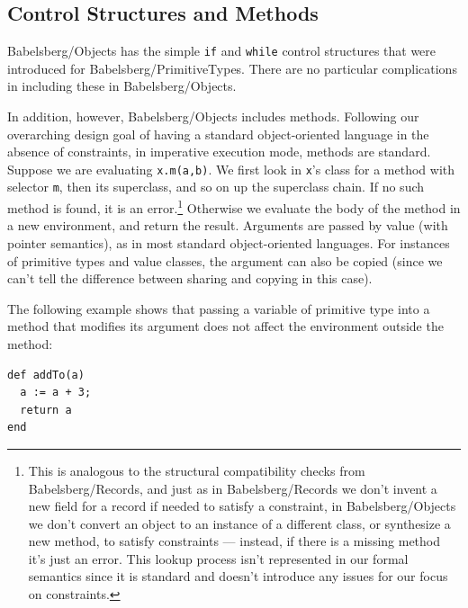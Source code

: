 \documentclass{article}
\def\ab#1{\textcolor{red}{\textsf{AB: #1}}}
\begin{document}

\subsection{Control Structures and Methods}

Babelsberg/Objects has the simple \verb|if| and \verb|while| control
structures that were introduced for Babelsberg/PrimitiveTypes.  There
are no particular complications in including these in
Babelsberg/Objects.

In addition, however, Babelsberg/Objects includes methods.  Following
our overarching design goal of having a standard object-oriented
language in the absence of constraints, in imperative execution mode,
methods are standard.  Suppose we are evaluating \verb|x.m(a,b)|.  We
first look in \verb|x|'s class for a method with selector \verb|m|,
then its superclass, and so on up the superclass chain.  If no such
method is found, it is an error.\footnote{This is analogous to the
  structural compatibility checks from Babelsberg/Records, and just as
  in Babelsberg/Records we don't invent a new field for a record if
  needed to satisfy a constraint, in Babelsberg/Objects we don't
  convert an object to an instance of a different class, or synthesize
  a new method, to satisfy constraints --- instead, if there is a
  missing method it's just an error.  This lookup process isn't
  represented in our formal semantics since it is standard and doesn't
  introduce any issues for our focus on constraints.}
Otherwise we evaluate the body of the method in a new environment, and
return the result.  Arguments are passed by value (with pointer
semantics), as in most standard object-oriented languages.  For
instances of primitive types and value classes, the argument can also
be copied (since we can't tell the difference between sharing and
copying in this case).

The following example shows that passing a variable of primitive type
into a method that modifies its argument does not affect the
environment outside the method:
\begin{verbatim}
def addTo(a)
  a := a + 3;
  return a
end
\end{verbatim}
\end{document}
